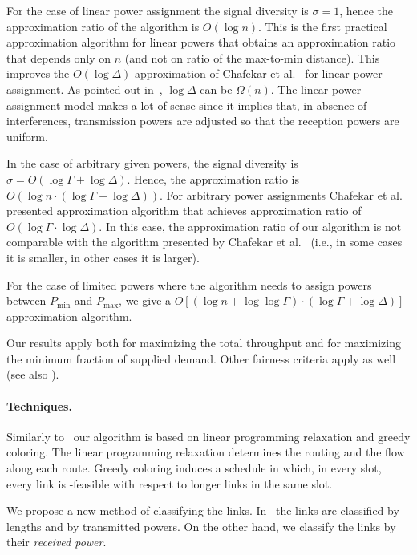 \documentclass[11pt]{article}
\newenvironment{proof sketch}{\noindent {\bf Proof sketch:} }{\hfill \qed}
\newcommand{\sinr}{\text{\sc{sinr}}}
\newcommand{\pmin}{P_{\min}}
\newcommand{\pmax}{P_{\max}}
\newcommand{\sigdiv}{\sigma}
\begin{document}
For the case of linear power assignment the signal diversity is
$\sigdiv =1$, hence the approximation ratio of the algorithm is
$O(\log n)$.  This is the first practical approximation
algorithm for linear powers that obtains an approximation ratio that
depends only on $n$ (and not on ratio of the max-to-min distance).
This improves the $O(\log \Delta)$-approximation of Chafekar et
al.~\cite{ChafekarCapacity} for linear power assignment.  As pointed
out in~\cite{goussevskaia2009capacity}, $\log \Delta$ can be
$\Omega(n)$.  The linear power assignment model makes a lot of sense
since it implies that, in absence of interferences, transmission
powers are adjusted so that the reception powers are uniform.

In the case of arbitrary given powers, the signal diversity is
$\sigdiv = O(\log\Gamma + \log \Delta)$.  Hence, the approximation
ratio is $O(\log n \cdot (\log\Gamma + \log \Delta))$.  For arbitrary
power assignments Chafekar et al.~\cite{ChafekarCapacity} presented
approximation algorithm that achieves approximation ratio of $O(\log
\Gamma \cdot \log \Delta)$.  In this case, the approximation ratio of
our algorithm is not comparable with the algorithm presented by
Chafekar et al.~\cite{ChafekarCapacity} (i.e., in some cases it is
smaller, in other cases it is larger).


For the case of limited powers where the algorithm needs to assign
powers between $\pmin$ and $\pmax$, we give a $O[(\log n + \log \log
\Gamma) \cdot (\log\Gamma + \log \Delta)]$-approximation algorithm.

Our results apply both for maximizing the total throughput and for
maximizing the minimum fraction of supplied demand. Other fairness
criteria apply as well (see also \cite{ChafekarPhD}).


\paragraph{Techniques.}
Similarly to~\cite{ChafekarCapacity} our algorithm is based on linear
programming relaxation and greedy coloring.
The linear programming relaxation determines the routing and the flow along each route.
Greedy coloring induces a schedule in which, in every slot, every link is \sinr-feasible with respect to longer links in the same slot.

We propose a new method of classifying the links.
In~\cite{ChafekarCapacity,halldorsson2009wireless} the links are classified by lengths and by
transmitted powers.
On the other hand, we classify the links by their \emph{received power}.
\end{document}
